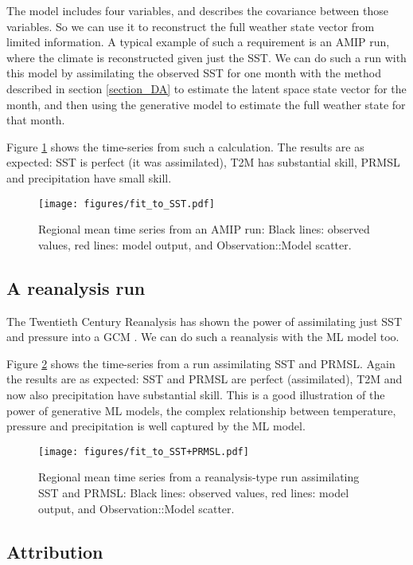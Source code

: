 \documentclass[gmd]{copernicus}
\begin{document}
The model includes four variables, and describes the covariance between those variables. So we can use it to reconstruct the full weather state vector from limited information. A typical example of such a requirement is an AMIP run, where the climate is reconstructed given just the SST. We can do such a run with this model by assimilating the observed SST for one month with the method described in section \ref{section_DA} to estimate the latent space state vector for the month, and then using the generative model to estimate the full weather state for that month.

Figure \ref{fit_to_SST} shows the time-series from such a calculation. The results are as expected: SST is perfect (it was assimilated), T2M has substantial skill, PRMSL and precipitation have small skill.

\begin{figure}[h]
\texttt{[image: figures/fit\_to\_SST.pdf]}
\caption{Regional mean time series from an AMIP run: Black lines: observed values, red lines: model output, and Observation::Model scatter.}
\label{fit_to_SST}
\end{figure}
    
\subsection{A reanalysis run}

The Twentieth Century Reanalysis has shown the power of assimilating just SST and pressure into a GCM \citep{slivinski_20crv3.1}. We can do such a reanalysis with the ML model too.

Figure \ref{fit_to_SST+PRMSL} shows the time-series from a run assimilating SST and PRMSL. Again the results are as expected: SST and PRMSL are perfect (assimilated), T2M and now also precipitation have substantial skill. This is a good illustration of the power of generative ML models, the complex relationship between temperature, pressure and precipitation is well captured by the ML model.

\begin{figure}[h]
\texttt{[image: figures/fit\_to\_SST+PRMSL.pdf]}
\caption{Regional mean time series from a reanalysis-type run assimilating SST and PRMSL: Black lines: observed values, red lines: model output, and Observation::Model scatter.}
\label{fit_to_SST+PRMSL}
\end{figure}

\subsection{Attribution}
\end{document}
